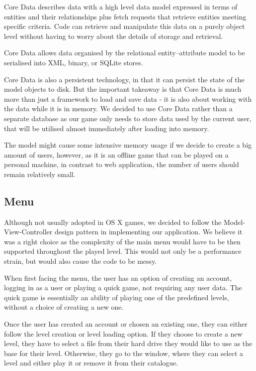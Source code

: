 Core Data describes data with a high level data model expressed in terms of entities and their relationships plus fetch requests that retrieve entities meeting specific criteria. Code can retrieve and manipulate this data on a purely object level without having to worry about the details of storage and retrieval. 

Core Data allows data organised by the relational entity–attribute model to be serialised into XML, binary, or SQLite stores.

Core Data is also a persistent technology, in that it can persist the state of the model objects to disk. But the important takeaway is that Core Data is much more than just a framework to load and save data - it is also about working with the data while it is in memory.
We decided to use Core Data rather than a separate database as our game only needs to store data used by the current user, that will be utilised almost immediately after loading into memory. 
  
The model might cause some intensive memory usage if we decide to create a big amount of users, however, as it is an offline game that can be played on a personal machine, in contrast to web application, the number of users should remain relatively small.

\vspace{10pt}

\subsection{Menu}

Although not usually adopted in OS X games, we decided to follow the Model-View-Controller design pattern in implementing our application. We believe it was a right choice as the complexity of the main menu would have to be then supported throughout the played level. This would not only be a performance strain, but would also cause the code to be messy.

When first facing the menu, the user has an option of creating an account, logging in as a user or playing a quick game, not requiring any user data. 
The quick game is essentially an ability of playing one of the predefined levels, without a choice of creating a new one.

Once the user has created an account or chosen an existing one, they can either follow the level creation or level loading option. If they choose to create a new level, they have to select a file from their hard drive they would like to use as the base for their level. Otherwise, they go to the window, where they can select a level and either play it or remove it from their catalogue.


